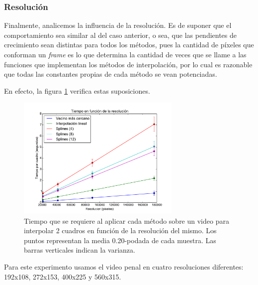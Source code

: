 \subsubsection{Resolución}
Finalmente, analicemos la influencia de la resolución. Es de suponer que el comportamiento sea similar al del caso anterior, o sea, que las pendientes de crecimiento sean distintas para todos los métodos, pues la cantidad de píxeles que conforman un \emph{frame} es lo que determina la cantidad de veces que se llame a las funciones que implementan los métodos de interpolación, por lo cual es razonable que todas las constantes propias de cada método se vean potenciadas.

En efecto, la figura \ref{fig:times-resolucion} verifica estas suposiciones.  

\begin{figure}[H]
 \centering
	\includegraphics[width=0.7\textwidth]{imgs/resultados_tiempos/resolucion.pdf}
	\caption{\footnotesize Tiempo que se requiere al aplicar cada método sobre un video para interpolar 2 cuadros en función de la resolución del mismo. Los puntos representan la media 0.20-podada de cada muestra. Las barras verticales indican la varianza.}
	\label{fig:times-resolucion}
\end{figure}

Para este experimento usamos el video penal en cuatro resoluciones diferentes: 192x108, 272x153, 400x225 y 560x315.